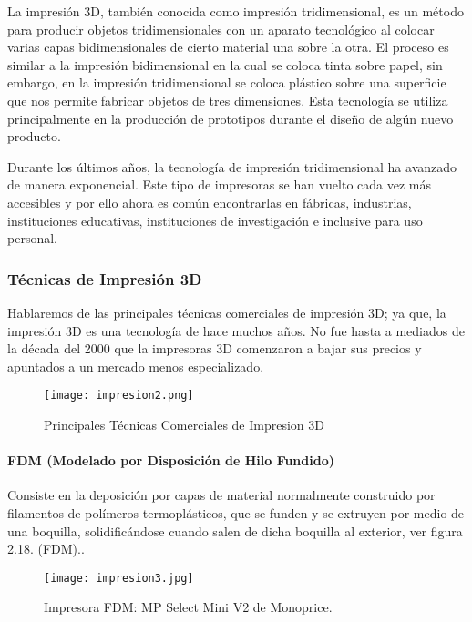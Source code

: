 \par \noindent
La impresión 3D, también conocida como impresión tridimensional, es un método para
producir objetos tridimensionales con un aparato tecnológico al colocar varias capas
bidimensionales de cierto material una sobre la otra. El proceso es similar a la impresión
bidimensional en la cual se coloca tinta sobre papel, sin embargo, en la impresión
tridimensional se coloca plástico sobre una superficie que nos permite fabricar objetos de tres
dimensiones. Esta tecnología se utiliza principalmente en la producción de prototipos durante
el diseño de algún nuevo producto.

\par \noindent
Durante los últimos años, la tecnología de impresión tridimensional ha avanzado de
manera exponencial. Este tipo de impresoras se han vuelto cada vez más accesibles y por ello
ahora es común encontrarlas en fábricas, industrias, instituciones educativas, instituciones de
investigación e inclusive para uso personal\cite{impresoras3d-monterrey}.

\subsubsection{Técnicas de Impresión 3D}

\par \noindent
Hablaremos de las principales técnicas comerciales de impresión 3D; ya que, la impresión 3D es una tecnología de hace muchos años. No fue hasta a mediados de la década del 2000 que la impresoras 3D comenzaron a bajar sus precios y apuntados a un mercado menos especializado.

\begin{figure}[H]
	\centering
	\texttt{[image: impresion2.png]}
	\caption{Principales Técnicas Comerciales de Impresion 3D}
\end{figure}

\paragraph{FDM (Modelado por Disposición de Hilo Fundido)}
Consiste en la deposición por capas de material normalmente construido por filamentos de polímeros termoplásticos, que se funden y se extruyen por medio de una boquilla, solidificándose cuando salen de dicha boquilla al exterior, ver figura 2.18. (FDM).\cite{impresoras3d-valverde}.

\begin{figure}[H]
	\centering
	\texttt{[image: impresion3.jpg]}
	\caption{Impresora FDM: MP Select Mini V2 de Monoprice.}
\end{figure}

